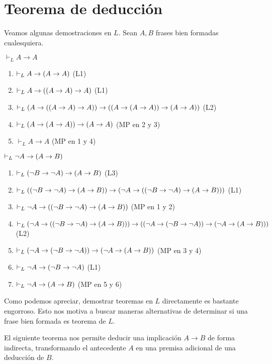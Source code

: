 \chapter{Teorema de deducción}

\begin{motivation}
Veamos algunas demostraciones en $L$. Sean $A,B$ frases bien formadas cualesquiera.

\begin{example}
$\vdash_L A \to A$

\begin{enumerate}
    \item $\vdash_L A \to (A \to A)$             \hfill (L1)
    \item $\vdash_L A \to ((A \to A) \to A)$ \hfill (L1)
    \item $\vdash_L (A \to ((A \to A) \to A)) \to ((A \to (A \to A)) \to (A \to A))$ \hfill (L2)
    \item $\vdash_L (A \to (A \to A)) \to (A \to A)$ \hfill (MP en 2 y 3)
    \item $\vdash_L          A \to A$     \hfill (MP en 1 y 4)
\end{enumerate}
\end{example}

\begin{example}
$\vdash_L \neg A \to (A \to B)$

\begin{enumerate}
    \item $\vdash_L (\neg B \to \neg A) \to (A \to B)$                                          \hfill (L3)
    \item $\vdash_L ((\neg B \to \neg A) \to (A \to B)) \to (\neg A \to ((\neg B \to \neg A) \to (A \to B)))$                      \hfill (L1)
    \item $\vdash_L      \neg A \to {((\neg B \to \neg A) \to (A \to B))}$                      \hfill (MP en 1 y 2)
    \item $\vdash_L (\neg A \to ((\neg B \to \neg A) \to (A \to B))) \to ((\neg A \to (\neg B \to \neg A)) \to (\neg A \to (A \to B)))$ \hfill (L2)
    \item $\vdash_L (\neg A \to (\neg B \to \neg A)) \to (\neg A \to (A \to B))$ \hfill (MP en 3 y 4)
    \item $\vdash_L \neg A \to (\neg B \to \neg A)$              \hfill (L1)
    \item $\vdash_L \neg A \to (A \to B)$                                          \hfill (MP en 5 y 6)
\end{enumerate}
\end{example}

Como podemos apreciar, demostrar teoremas en $L$ directamente es bastante engorroso. Esto nos motiva a buscar maneras alternativas de determinar si una frase bien formada es teorema de $L$.

El siguiente teorema nos permite deducir una implicación $A \to B$ de forma indirecta, transformando el antecedente $A$ en una premisa adicional de una deducción de $B$.
\end{motivation}


